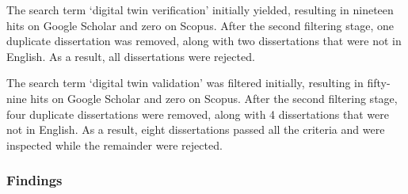 \documentclass{llncs}
\begin{document}
    The search term `digital twin verification' initially yielded, resulting in nineteen hits on Google Scholar and zero on Scopus. After the second filtering stage, one duplicate dissertation was removed, along with two dissertations that were not in English.
    As a result, all dissertations were rejected. 

    The search term `digital twin validation' was filtered initially, resulting in fifty-nine hits on Google Scholar and zero on Scopus. After the second filtering stage, four duplicate dissertations were removed, along with 4 dissertations that were not in English.
    As a result, eight dissertations passed all the criteria and were inspected while the remainder were rejected.

    \subsubsection*{Findings}
\end{document}
